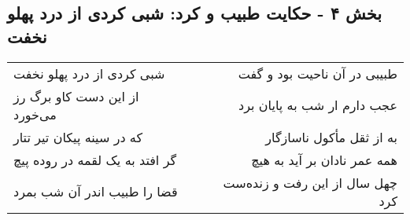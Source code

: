 \begin{center}
\section*{بخش ۴ - حکایت طبیب و کرد: شبی کردی از درد پهلو نخفت}
\label{sec:004}
\begin{longtable}{l p{0.5cm} r}
شبی کردی از درد پهلو نخفت
&&
طبیبی در آن ناحیت بود و گفت
\\
از این دست کاو برگ رز می‌خورد
&&
عجب دارم ار شب به پایان برد
\\
که در سینه پیکان تیر تتار
&&
به از ثقل مأکول ناسازگار
\\
گر افتد به یک لقمه در روده پیچ
&&
همه عمر نادان بر آید به هیچ
\\
قضا را طبیب اندر آن شب بمرد
&&
چهل سال از این رفت و زنده‌ست کرد
\\
\end{longtable}
\end{center}
